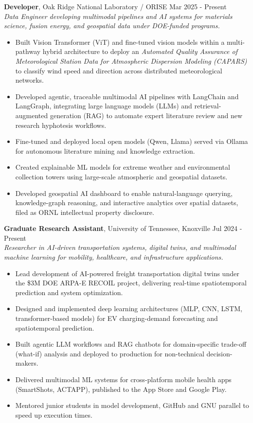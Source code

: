 \documentclass[10pt, letterpaper]{article}
\newenvironment{highlights}{
    \begin{itemize}[
        topsep=0.10 cm,
        parsep=0.10 cm,
        partopsep=0pt,
        itemsep=0pt,
        leftmargin=0 cm + 10pt
    ]
}{
    \end{itemize}
} %
\begin{document}
\noindent\textbf{Developer}, Oak Ridge National Laboratory / ORISE \hfill Mar 2025 - Present\\
\textit{Data Engineer developing multimodal pipelines and AI systems for materials science, fusion energy, and geospatial data under DOE-funded programs.}
\begin{highlights}
    \item Built Vision Transformer (ViT) and fine-tuned vision models within a multi-pathway hybrid architecture to deploy an \textit{Automated Quality Assurance of Meteorological Station Data for Atmospheric Dispersion Modeling (CAPARS)} to classify wind speed and direction across distributed meteorological networks.
    \item Developed agentic, traceable multimodal AI pipelines with LangChain and LangGraph, integrating large language models (LLMs) and retrieval-augmented generation (RAG) to automate expert literature review and new research hyphotesis workflows.
    \item Fine-tuned and deployed local open models (Qwen, Llama) served via Ollama for autonomous literature mining and knowledge extraction.
    \item Created explainable ML models for extreme weather and environmental collection towers using large-scale atmospheric and geospatial datasets.
    \item Developed geospatial AI dashboard to enable natural-language querying, knowledge-graph reasoning, and interactive analytics over spatial datasets, filed as ORNL intellectual property disclosure.
\end{highlights}


\vspace{0.2cm}
\noindent\textbf{Graduate Research Assistant}, University of Tennessee, Knoxville \hfill Jul 2024 - Present\\
\textit{Researcher in AI-driven transportation systems, digital twins, and multimodal machine learning for mobility, healthcare, and infrastructure applications.}
\begin{highlights}
    \item Lead development of AI-powered freight transportation digital twins under the \$3M DOE ARPA-E RECOIL project, delivering real-time spatiotemporal prediction and system optimization.
    \item Designed and implemented deep learning architectures (MLP, CNN, LSTM, transformer-based models) for EV charging-demand forecasting and spatiotemporal prediction.
    \item Built agentic LLM workflows and RAG chatbots for domain-specific trade-off (what-if) analysis and deployed to production for non-technical decision-makers.
    \item Delivered multimodal ML systems for cross-platform mobile health apps (SmartShots, ACTAPP), published to the App Store and Google Play.
    \item Mentored junior students in model development, GitHub and GNU parallel to speed up execution times.
\end{highlights}
\end{document}

